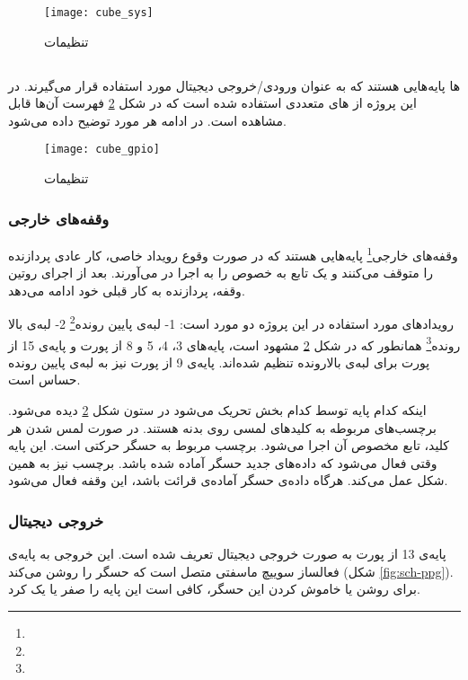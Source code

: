 	\begin{figure}[h]
		\centering
		\texttt{[image: cube\_sys]}
		\caption{تنظیمات }
		\label{fig:cube-sys}
	\end{figure}

\subsection{}\label{sec:gpio}
ها پایه‌هایی هستند که به عنوان ورودی/خروجی دیجیتال مورد استفاده قرار می‌گیرند. در این پروژه از های متعددی استفاده شده است که در شکل \ref{fig:cube-gpio} فهرست آن‌ها قابل مشاهده است. در ادامه هر مورد توضیح داده می‌‌شود.

	\begin{figure}[h]
		\centering
		\texttt{[image: cube\_gpio]}
		\caption{تنظیمات }
		\label{fig:cube-gpio}
	\end{figure}

\subsubsection{وقفه‌های خارجی}
وقفه‌های خارجی\footnote{}
پایه‌هایی هستند که در صورت وقوع رویداد خاصی، کار عادی پردازنده را متوقف می‌کنند و یک تابع به خصوص را به اجرا در می‌آورند. بعد از اجرای روتین وقفه، پردازنده به کار قبلی خود ادامه می‌دهد.

رویدادهای مورد استفاده در این پروژه دو مورد است: 1- لبه‌ی پایین رونده\footnote{}
2- لبه‌ی بالا رونده\footnote{}
همانطور که در شکل \ref{fig:cube-gpio} مشهود است، پایه‌های 3، 4، 5 و 8 از پورت  و پایه‌ی 15 از پورت  برای لبه‌ی بالارونده تنظیم شده‌اند. پایه‌ی 9 از پورت  نیز به لبه‌ی پایین رونده حساس است.

اینکه کدام پایه توسط کدام بخش تحریک می‌شود در ستون  شکل \ref{fig:cube-gpio} دیده می‌شود. برچسب‌های  مربوطه به کلیدهای لمسی روی بدنه هستند. در صورت لمس شدن هر کلید، تابع مخصوص آن اجرا می‌شود. برچسب  مربوط به حسگر حرکتی است. این پایه وقتی فعال می‌شود که داده‌های جدید حسگر آماده شده باشد. برچسب  نیز به همین شکل عمل می‌کند. هرگاه داده‌ی حسگر  آماده‌ی قرائت باشد، این وقفه فعال می‌شود.

\subsubsection{خروجی دیجیتال}
پایه‌ی 13 از پورت  به صورت خروجی دیجیتال تعریف شده است. این خروجی به پایه‌ی فعالساز سوییچ ماسفتی متصل است که حسگر  را روشن می‌کند (شکل \ref{fig:sch-ppg}). برای روشن یا خاموش کردن این حسگر، کافی است این پایه را صفر یا یک کرد.

